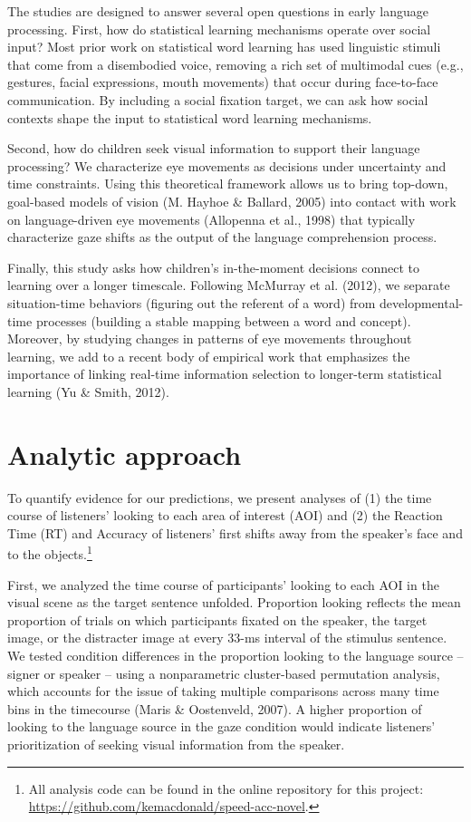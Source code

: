 \documentclass[oneside]{report}
\begin{document}
The studies are designed to answer several open questions in early
language processing. First, how do statistical learning mechanisms
operate over social input? Most prior work on statistical word learning
has used linguistic stimuli that come from a disembodied voice, removing
a rich set of multimodal cues (e.g., gestures, facial expressions, mouth
movements) that occur during face-to-face communication. By including a
social fixation target, we can ask how social contexts shape the input
to statistical word learning mechanisms.

Second, how do children seek visual information to support their
language processing? We characterize eye movements as decisions under
uncertainty and time constraints. Using this theoretical framework
allows us to bring top-down, goal-based models of vision (M. Hayhoe \&
Ballard, 2005) into contact with work on language-driven eye movements
(Allopenna et al., 1998) that typically characterize gaze shifts as the
output of the language comprehension process.

Finally, this study asks how children's in-the-moment decisions connect
to learning over a longer timescale. Following McMurray et al. (2012),
we separate situation-time behaviors (figuring out the referent of a
word) from developmental-time processes (building a stable mapping
between a word and concept). Moreover, by studying changes in patterns
of eye movements throughout learning, we add to a recent body of
empirical work that emphasizes the importance of linking real-time
information selection to longer-term statistical learning (Yu \& Smith,
2012).

\section{Analytic approach}\label{analytic-approach-1}

To quantify evidence for our predictions, we present analyses of (1) the
time course of listeners' looking to each area of interest (AOI) and (2)
the Reaction Time (RT) and Accuracy of listeners' first shifts away from
the speaker's face and to the objects.\footnote{All analysis code can be
  found in the online repository for this project:
  \url{https://github.com/kemacdonald/speed-acc-novel}.}

First, we analyzed the time course of participants' looking to each AOI
in the visual scene as the target sentence unfolded. Proportion looking
reflects the mean proportion of trials on which participants fixated on
the speaker, the target image, or the distracter image at every 33-ms
interval of the stimulus sentence. We tested condition differences in
the proportion looking to the language source -- signer or speaker --
using a nonparametric cluster-based permutation analysis, which accounts
for the issue of taking multiple comparisons across many time bins in
the timecourse (Maris \& Oostenveld, 2007). A higher proportion of
looking to the language source in the gaze condition would indicate
listeners' prioritization of seeking visual information from the
speaker.
\end{document}
